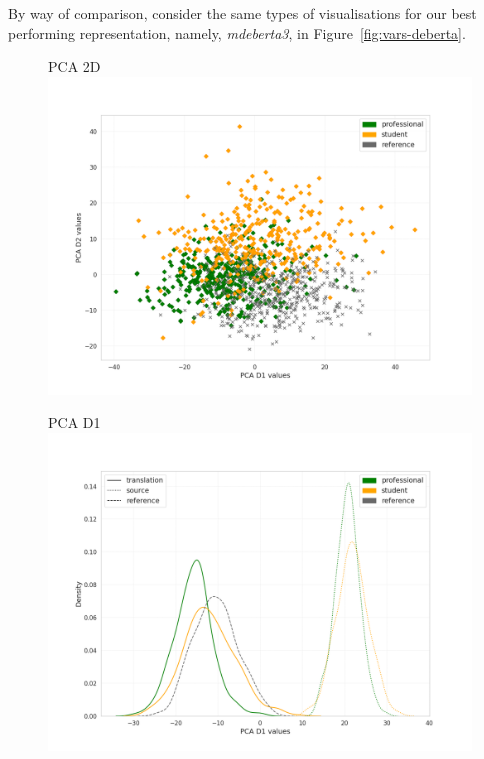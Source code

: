 By way of comparison, consider the same types of visualisations for our best performing representation, namely, \textit{mdeberta3}, in Figure~\ref{fig:vars-deberta}. 

\begin{figure}[H]
	\begin{minipage}[c]{0.31\linewidth}
		\centering
		PCA	2D 
		\includegraphics[width=\linewidth]{figures/pca/var-ttype-mdeberta3-base-PCA-scatter}
	\end{minipage}	
	\begin{minipage}[c]{0.31\linewidth}
		\centering
		PCA D1
		\includegraphics[width=\linewidth]{figures/pca/src-var-ttype-mdeberta3-base-PCA-D1-lines}
	\end{minipage}

\end{figure}
